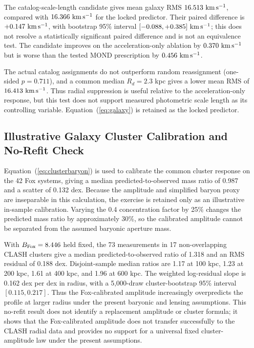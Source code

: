 \documentclass[aps,prd,reprint,superscriptaddress,showpacs,floatfix,longbibliography]{revtex4-2}
\begin{document}
The catalog-scale-length candidate gives mean galaxy RMS $16.513\ {\rm km\,s^{-1}}$, compared with $16.366\ {\rm km\,s^{-1}}$ for the locked predictor. Their paired difference is $+0.147\ {\rm km\,s^{-1}}$, with bootstrap 95\% interval $[-0.088,+0.385]\ {\rm km\,s^{-1}}$; this does not resolve a statistically significant paired difference and is not an equivalence test. The candidate improves on the acceleration-only ablation by $0.370\ {\rm km\,s^{-1}}$ but is worse than the tested MOND prescription by $0.456\ {\rm km\,s^{-1}}$.

The actual catalog assignments do not outperform random reassignment (one-sided $p=0.711$), and a common median $R_d=2.3$ kpc gives a lower mean RMS of $16.413\ {\rm km\,s^{-1}}$. Thus radial suppression is useful relative to the acceleration-only response, but this test does not support measured photometric scale length as its controlling variable. Equation~(\ref{eq:galaxy}) is retained as the locked predictor.

\subsection{Illustrative Galaxy Cluster Calibration and No-Refit Check}

Equation~(\ref{eq:clusterbaryon}) is used to calibrate the common cluster response on the 42 Fox systems, giving a median predicted-to-observed mass ratio of 0.987 and a scatter of 0.132 dex. Because the amplitude and simplified baryon proxy are inseparable in this calculation, the exercise is retained only as an illustrative in-sample calibration. Varying the 0.4 concentration factor by 25\% changes the predicted mass ratio by approximately 30\%, so the calibrated amplitude cannot be separated from the assumed baryonic aperture mass.

With $B_{\rm Fox}=8.446$ held fixed, the 73 measurements in 17 non-overlapping CLASH clusters give a median predicted-to-observed ratio of 1.318 and an RMS residual of 0.188 dex. Disjoint-sample median ratios are 1.17 at 100 kpc, 1.23 at 200 kpc, 1.61 at 400 kpc, and 1.96 at 600 kpc. The weighted log-residual slope is 0.162 dex per dex in radius, with a 5,000-draw cluster-bootstrap 95\% interval $[0.115,0.217]$. Thus the Fox-calibrated amplitude increasingly overpredicts the profile at larger radius under the present baryonic and lensing assumptions. This no-refit result does not identify a replacement amplitude or cluster formula; it shows that the Fox-calibrated amplitude does not transfer successfully to the CLASH radial data and provides no support for a universal fixed cluster-amplitude law under the present assumptions.
\end{document}
